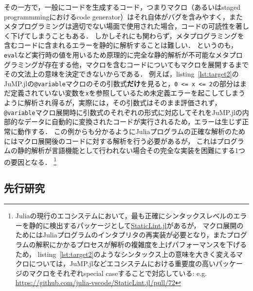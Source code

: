その一方で，一般にコードを生成するコード，つまりマクロ（あるいはstaged programmmingにおけるcode generator）はそれ自体がバグを含みやすく，またメタプログラミングは適切でない場面で使用された場合，コードの可読性を著しく下げてしまうこともある．
しかしそれにも関わらず，メタプログラミングを含むコードに含まれるエラーを静的に解析することは難しい．
というのも，\texttt{eval}など実行時の値を用いるため原理的に完全な静的解析が不可能なメタプログラミングが存在する他，マクロを含むコードについてもマクロを展開するまでその文法上の意味を決定できないからである．
例えば，listing~\ref{lst:target2}のJuMP.jlの\texttt{@variable}マクロのその引数式\textbf{だけ}を見ると，\texttt{0 <= x <= 2}の部分はまだ定義されていない変数を\texttt{x}を参照しているため未定義エラーを起こしてしまうように解析され得るが，実際には，その引数式はそのまま評価されず，\texttt{@variable}マクロ展開時に引数式のそれぞれの形式に対応してそれをJuMP.jlの内部的なデータに自動的に変換されたコードが実行されるため，エラーは生じず正常に動作する．
この例からも分かるようにJuliaプログラムの正確な解析のためにはマクロ展開後のコードに対する解析を行う必要があるが，
これはプログラムの静的解析が言語機能として行われない場合その完全な実装を困難にする1つの要因となる．
\footnote{
  Juliaの現行のエコシステムにおいて，最も正確にシンタックスレベルのエラーを静的に検出するパッケージとして\href{https://github.com/julia-vscode/StaticLint.jl}{StaticLint.jl}があるが，
  マクロ展開のためにはJuliaプログラムのインタプリタの再実装が必要となり，またプログラムの解釈にかかるプロセスが解析の複雑度を上げパフォーマンスを下げるため，
  listing~\ref{lst:target2}のようなシンタックス上の意味を大きく変えるマクロについては，JuMP.jlなどエコシステムにおける重要度の高いパッケージのマクロをそれぞれspecial caseすることで対応している:
  e.g. \url{https://github.com/julia-vscode/StaticLint.jl/pull/72}
}


\subsection{先行研究}

